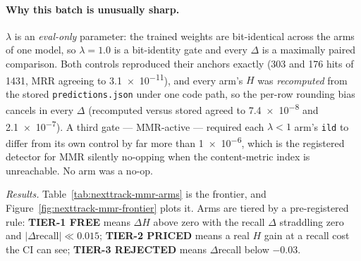 \documentclass[11pt]{article}
\begin{document}
\paragraph{Why this batch is unusually sharp.} $\lambda$ is an \emph{eval-only}
parameter: the trained weights are bit-identical across the arms of one model, so
$\lambda=\num{1.0}$ is a bit-identity gate and every $\Delta$ is a maximally
paired comparison. Both controls reproduced their anchors exactly (\num{303} and
\num{176} hits of \num{1431}, MRR agreeing to \num{3.1e-11}), and every arm's $H$
was \emph{recomputed} from the stored \texttt{predictions.json} under one code
path, so the per-row rounding bias cancels in every $\Delta$ (recomputed versus
stored agreed to \num{7.4e-8} and \num{2.1e-7}). A third gate --- MMR-active ---
required each $\lambda<1$ arm's \texttt{ild} to differ from its own control by far
more than \num{1e-6}, which is the registered detector for MMR silently no-opping
when the content-metric index is unreachable. No arm was a no-op.

\emph{Results.} Table~\ref{tab:nexttrack-mmr-arms} is the frontier, and
Figure~\ref{fig:nexttrack-mmr-frontier} plots it. Arms are tiered by a
pre-registered rule: \textbf{TIER-1 FREE} means $\Delta H$ above zero with the
recall $\Delta$ straddling zero and $|\Delta\text{recall}| \ll \num{0.015}$;
\textbf{TIER-2 PRICED} means a real $H$ gain at a recall cost the CI can see;
\textbf{TIER-3 REJECTED} means $\Delta$recall below $-\num{0.03}$.
\end{document}
